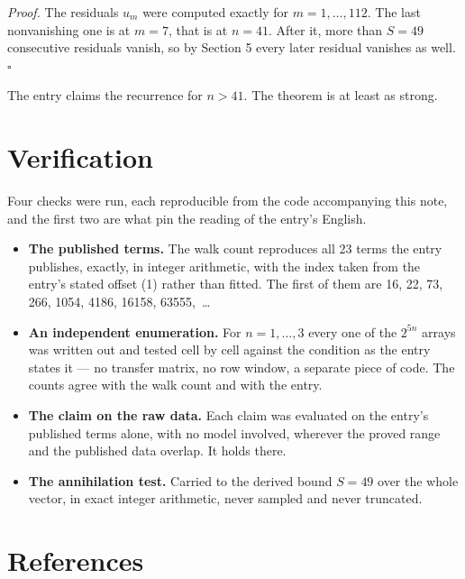 \documentclass[11pt]{article}
\theoremstyle{definition}
\begin{document}
{\itshape Proof.} The residuals $u_m$ were computed exactly for $m = 1,\dots,112$. The last nonvanishing one is at $m = 7$, that is at $n = 41$. After it, more than $S = 49$ consecutive residuals vanish, so by Section 5 every later residual vanishes as well. $\square$

The entry claims the recurrence for $n > 41$. The theorem is at least as strong.

\section{Verification}

Four checks were run, each reproducible from the code accompanying this note, and the first two are what pin the reading of the entry's English.

\begin{itemize}

\item {\bfseries The published terms.} The walk count reproduces all 23 terms the entry publishes, exactly, in integer arithmetic, with the index taken from the entry's stated offset (1) rather than fitted. The first of them are 16, 22, 73, 266, 1054, 4186, 16158, 63555,~\dots

\item {\bfseries An independent enumeration.} For $n = 1,\dots,3$ every one of the $2^{5n}$ arrays was written out and tested cell by cell against the condition as the entry states it --- no transfer matrix, no row window, a separate piece of code. The counts agree with the walk count and with the entry.

\item {\bfseries The claim on the raw data.} Each claim was evaluated on the entry's published terms alone, with no model involved, wherever the proved range and the published data overlap. It holds there.

\item {\bfseries The annihilation test.} Carried to the derived bound $S = 49$ over the whole vector, in exact integer arithmetic, never sampled and never truncated.

\end{itemize}

\section{References}
\end{document}
